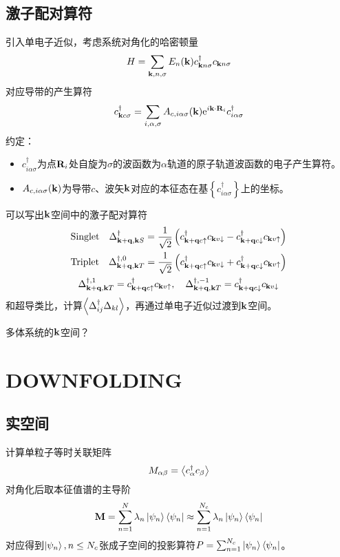 \documentclass{article}
\begin{document}
	\subsection{激子配对算符}
	引入单电子近似，考虑系统对角化的哈密顿量
	\begin{equation}
	H = \sum_{\vb{k},n,\sigma}E_n(\vb{k})c^\dagger_{\vb{k}n\sigma}c_{\vb{k}n\sigma}
	\end{equation}
	对应导带的产生算符
	\begin{equation}
	c^\dagger_{\vb{k}c\sigma}=\sum_{i,\alpha,\sigma}A_{c,i\alpha\sigma}(\vb{k})\mathrm{e}^{i\vb{k}\cdot \vb{R}_i}c^\dagger_{i\alpha\sigma}
	\end{equation}
	约定：
	\begin{itemize}
		\item $c^\dagger_{i\alpha\sigma} $为点$\vb{R}_i$处自旋为$\sigma$的波函数为$\alpha$轨道的原子轨道波函数的电子产生算符。
		\item $A_{c,i\alpha\sigma}(\vb{k})$为导带$c$、波矢$\vb{k}$对应的本征态在基$\left\{ c^\dagger_{i\alpha\sigma} \right\}$上的坐标。
	\end{itemize}
	可以写出$\vb{k}$空间中的激子配对算符
	\begin{equation}
		\begin{gathered}
		\text{Singlet}\quad \Delta^\dagger_{\vb{k+q,k}S} =
		\frac{1}{\sqrt{2}}\left(c^\dagger_{\vb{k+q}c\uparrow}c_{\vb{k}v\downarrow}-c^\dagger_{\vb{k+q}c\downarrow}c_{\vb{k}v\uparrow}\right)\\
		\text{Triplet}\quad \Delta^{\dagger,0}_{\vb{k+q,k}T} = 
		\frac{1}{\sqrt{2}}\left(c^\dagger_{\vb{k+q}c\uparrow}c_{\vb{k}v\downarrow}+c^\dagger_{\vb{k+q}c\downarrow}c_{\vb{k}v\uparrow}\right)\\
		\Delta^{\dagger,1}_{\vb{k+q,k}T} = c^\dagger_{\vb{k+q}c\uparrow}c_{\vb{k}v\uparrow},\quad 
		\Delta^{\dagger,-1}_{\vb{k+q,k}T} = c^\dagger_{\vb{k+q}c\downarrow}c_{\vb{k}v\downarrow}
		\end{gathered}
	\end{equation}
	和超导类比，计算$\expval{\Delta_{ij}^{\dagger}\Delta_{kl}}$，再通过单电子近似过渡到$\vb{k}$空间。
	
	多体系统的$\vb{k}$空间？
	\section{DOWNFOLDING}
	\subsection{实空间}\label{实空间}
	计算单粒子等时关联矩阵
	\begin{equation}
		M_{\alpha\beta} = \expval{c^\dagger_\alpha c_\beta}
	\end{equation}
	对角化后取本征值谱的主导阶
	\begin{equation}
		\vb{M}=\sum_{n=1}^N\lambda_n\ket{\psi_n}\bra{\psi_n}\approx \sum_{n=1}^{N_c}\lambda_n\ket{\psi_n}\bra{\psi_n}
	\end{equation}
	对应得到$\ket{\psi_n},n\leq N_c$张成子空间的投影算符$P=\sum_{n=1}^{N_c}\ket{\psi_n}\bra{\psi_n}$。
\end{document}
